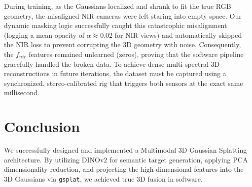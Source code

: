 \documentclass[12pt]{article}
\begin{document}
During training, as the Gaussians localized and shrank to fit the true RGB geometry, the misaligned NIR cameras were left staring into empty space. Our dynamic masking logic successfully caught this catastrophic misalignment (logging a mean opacity of $\alpha \approx 0.02$ for NIR views) and automatically skipped the NIR loss to prevent corrupting the 3D geometry with noise. Consequently, the $f_{nir}$ features remained unlearned (zeros), proving that the software pipeline gracefully handled the broken data. To achieve dense multi-spectral 3D reconstructions in future iterations, the dataset must be captured using a synchronized, stereo-calibrated rig that triggers both sensors at the exact same millisecond.

\section{Conclusion}
We successfully designed and implemented a Multimodal 3D Gaussian Splatting architecture. By utilizing DINOv2 for semantic target generation, applying PCA dimensionality reduction, and projecting the high-dimensional features into the 3D Gaussians via \texttt{gsplat}, we achieved true 3D fusion in software.
\end{document}
